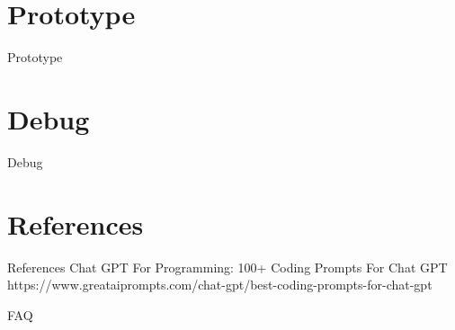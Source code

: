 \documentclass{beamer}
\begin{document}
\section{Prototype}
\begin{frame}{Prototype}
\end{frame}

\section{Debug}
\begin{frame}{Debug}
\end{frame}

\section{References}
\begin{frame}{References}
  Chat GPT For Programming: 100+ Coding Prompts For Chat GPT
  https://www.greataiprompts.com/chat-gpt/best-coding-prompts-for-chat-gpt
\end{frame}

\begin{frame}{FAQ}

\end{frame}
\end{document}
